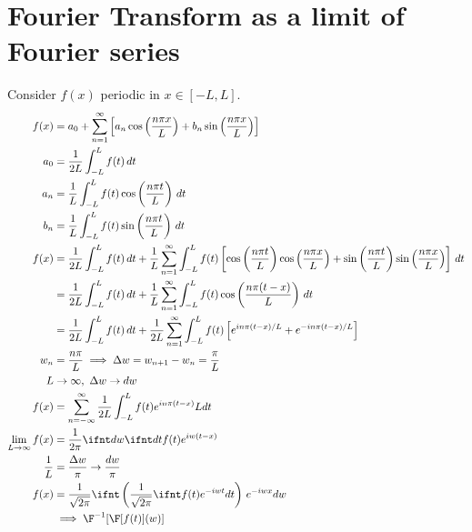 \documentclass[cplx.tex]{subfiles}
\begin{document}
\section{Fourier Transform as a limit of Fourier series}
Consider $f(x)$ periodic in $x \in [-L,L]$.
\begin{align}
    f(x) &= a_0 + \sum_{n=1}^\infty \left[a_n\cos\left(\frac{n\pi x}{L}\right) + b_n\sin\left(\frac{n\pi x}{L}\right)\right] \\
    a_0 &= \frac{1}{2L} \int_{-L}^L f(t)\,dt \\
    a_n &= \frac{1}{L} \int_{-L}^L f(t)\cos\left(\frac{n\pi t}{L}\right)\,dt \\
    b_n &= \frac{1}{L} \int_{-L}^L f(t)\sin\left(\frac{n\pi t}{L}\right)\,dt \\
    f(x) &= \frac{1}{2L} \int_{-L}^L f(t)\,dt + \frac{1}{L} \sum_{n=1}^\infty \int_{-L}^L f(t)\left[\cos\left(\frac{n\pi t}{L}\right)\cos\left(\frac{n\pi x}{L}\right) + \sin\left(\frac{n\pi t}{L}\right)\sin\left(\frac{n\pi x}{L}\right)\right]\,dt \\
         &= \frac{1}{2L} \int_{-L}^L f(t)\,dt + \frac{1}{L}\sum_{n=1}^\infty \int_{-L}^L f(t)\cos\left(\frac{n\pi(t-x)}{L}\right)\,dt \\
         &= \frac{1}{2L} \int_{-L}^L f(t)\,dt + \frac{1}{2L}\sum_{n=1}^\infty \int_{-L}^L f(t)\left[e^{in\pi(t-x)/L} + e^{-in\pi(t-x)/L}\right] \\
    w_n &= \frac{n\pi}{L} \implies \Delta w = w_{n+1} - w_n = \frac{\pi}{L} \\
    L &\to \infty,~ \Delta w \to dw \\
    f(x) &= \sum_{n=-\infty}^\infty \frac{1}{2L} \int_{-L}^L f(t)e^{in\pi(t-x)}{L}dt \\
    \lim_{L\to\infty} f(x) &= \frac{1}{2\pi} \ifnt dw \ifnt dt f(t)e^{iw(t-x)} \\
    \frac{1}{L} &= \frac{\Delta w}{\pi} \to \frac{dw}{\pi} \\
    f(x) &= \frac{1}{\sqrt{2\pi}} \ifnt \left(\frac{1}{\sqrt{2\pi}} \ifnt f(t)e^{-iwt}dt\right)\,e^{-iwx}dw \\
         &\implies \F^{-1}[\F[f(t)](w)]
\end{align}
\end{document}
